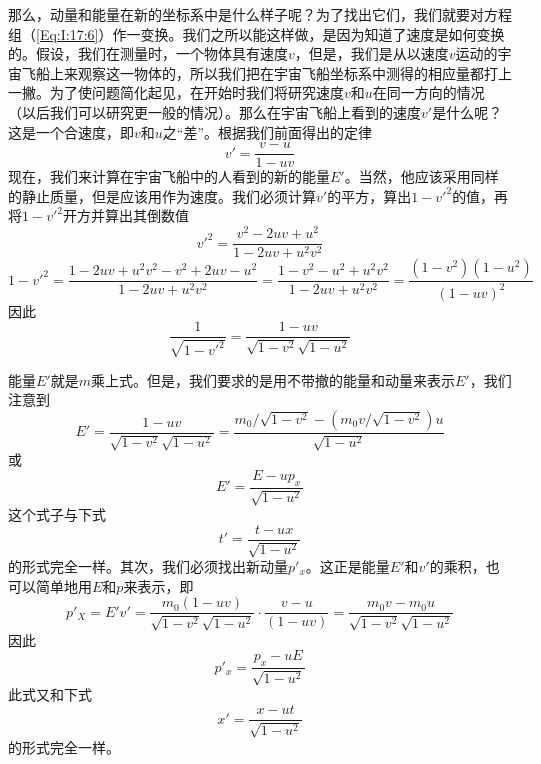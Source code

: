那么，动量和能量在新的坐标系中是什么样子呢？为了找出它们，我们就要对方程组（\ref{Eq:I:17:6}）作一变换。我们之所以能这样做，是因为知道了速度是如何变换的。假设，我们在测量时，一个物体具有速度$v$，但是，我们是从以速度$v$运动的宇宙飞船上来观察这一物体的，所以我们把在宇宙飞船坐标系中测得的相应量都打上一撇。为了使问题简化起见，在开始时我们将研究速度$v$和$u$在同一方向的情况（以后我们可以研究更一般的情况）。那么在宇宙飞船上看到的速度$v'$是什么呢？这是一个合速度，即$v$和$u$之“差”。根据我们前面得出的定律
\begin{equation}
    \label{Eq:I:17:8}
    v'=\frac{v-u}{1-uv}
\end{equation}
现在，我们来计算在宇宙飞船中的人看到的新的能量$E'$。当然，他应该采用同样的静止质量，但是应该用作为速度。我们必须计算$v'$的平方，算出$1-v'^2$的值，再将$1-v'^2$开方并算出其倒数值
\begin{equation*}
    v'^2=\frac{v^2-2uv+u^2}{1-2uv+u^2v^2}
\end{equation*}
\begin{equation*}
    1-v'^2=\frac{1-2uv+u^2v^2-v^2+2uv-u^2}{1-2uv+u^2v^2}=\frac{1-v^2-u^2+u^2v^2}{1-2uv+u^2v^2}=\frac{(1-v^2)(1-u^2)}{(1-uv)^2}
\end{equation*}
因此
\begin{equation}
    \label{Eq:I:17:9}
    \frac{1}{\sqrt{1-v'^2}}=\frac{1-uv}{\sqrt{1-v^2}\sqrt{1-u^2}}
\end{equation}

能量$E'$就是$m$乘上式。但是，我们要求的是用不带撤的能量和动量来表示$E'$，我们注意到
\begin{equation*}
    E'=\frac{1-uv}{\sqrt{1-v^2}\sqrt{1-u^2}}=\frac{m_0/\sqrt{1-v^2}-(m_0v/\sqrt{1-v^2})u}{\sqrt{1-u^2}}
\end{equation*}
或
\begin{equation}
    \label{Eq:I:17:10}
    E'=\frac{E-up_x}{\sqrt{1-u^2}}
\end{equation}
这个式子与下式
\begin{equation*}
    t'=\frac{t-ux}{\sqrt{1-u^2}}
\end{equation*}
的形式完全一样。其次，我们必须找出新动量$p'_x$。这正是能量$E'$和$v'$的乘积，也可以简单地用$E$和$p$来表示，即
\begin{equation*}
    p'_X=E'v'=\frac{m_0(1-uv)}{\sqrt{1-v^2}\sqrt{1-u^2}} \cdot \frac{v-u}{(1-uv)}=\frac{m_0v-m_0u}{\sqrt{1-v^2}\sqrt{1-u^2}}
\end{equation*}
因此
\begin{equation}
    \label{Eq:I:17:11}
    p'_x=\frac{p_x-uE}{\sqrt{1-u^2}}
\end{equation}
此式又和下式
\begin{equation*}
    x'=\frac{x-ut}{\sqrt{1-u^2}}
\end{equation*}
的形式完全一样。

